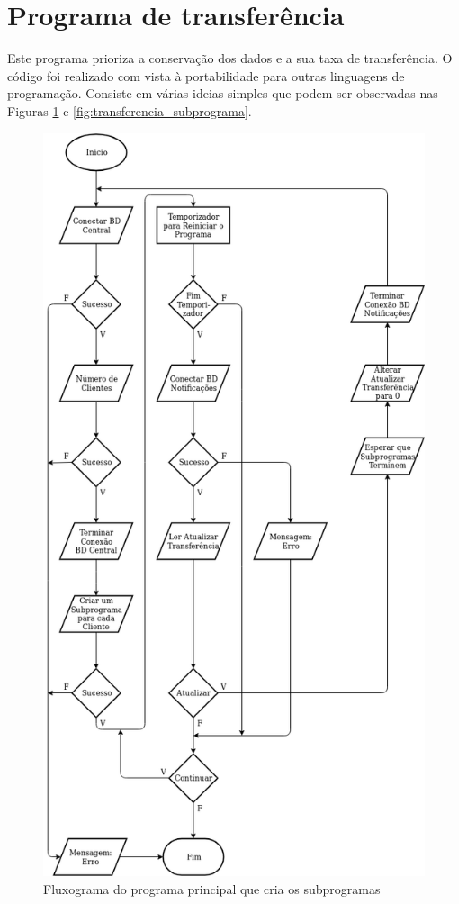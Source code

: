 \documentclass[11pt,twoside,a4paper]{report}
\begin{document}
\section{Programa de transferência}
\label{subchap:transferencia}
Este programa prioriza a conservação dos dados e a sua taxa de transferência. O código foi realizado com vista à portabilidade para outras linguagens de programação. Consiste em várias ideias simples que podem ser observadas nas Figuras \ref{fig:transferencia_programa} e \ref{fig:transferencia_subprograma}.\par 
\begin{figure}
	\vspace{-3cm}
	\begin{center}
		\includegraphics[width=.75\textwidth]{fluxograma_transferencia_programa3} %
		\caption{Fluxograma do programa principal que cria os subprogramas}
		\label{fig:transferencia_programa}
	\end{center}
\end{figure}
\end{document}
